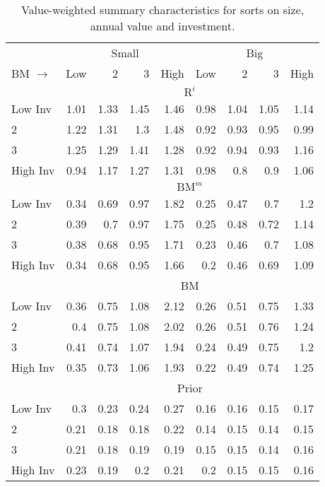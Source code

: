 
\begin{table}[!ht]
\scriptsize
\centering
\caption{
\scriptsize{
Value-weighted summary characteristics for sorts on size, annual value and
investment.
}
}
\begin{tabular}{lrrrrrrrr}
  \toprule
     & \multicolumn{4}{c}{Small} & \multicolumn{4}{c}{Big}  \\
     \cmidrule(r){2-5} \cmidrule(r){6-9}
    BM $\rightarrow$ & Low & 2 & 3 & High & Low & 2 & 3 & High  \\ 
  \midrule
  
  
    & \multicolumn{8}{c}{$\text{R}^i$}  \\
     \cmidrule(r){2-5} \cmidrule(r){6-9}
    Low Inv  & 1.01  & 1.33  & 1.45  & 1.46  & 0.98  & 1.04  & 1.05  & 1.14   \\
    2  & 1.22  & 1.31  & 1.3  & 1.48  & 0.92  & 0.93  & 0.95  & 0.99   \\
    3  & 1.25  & 1.29  & 1.41  & 1.28  & 0.92  & 0.94  & 0.93  & 1.16   \\
    High Inv  & 0.94  & 1.17  & 1.27  & 1.31  & 0.98  & 0.8  & 0.9  & 1.06   \\
    
  
    & \multicolumn{8}{c}{$\text{BM}^m$}  \\
     \cmidrule(r){2-5} \cmidrule(r){6-9}
    Low Inv  & 0.34  & 0.69  & 0.97  & 1.82  & 0.25  & 0.47  & 0.7  & 1.2   \\
    2  & 0.39  & 0.7  & 0.97  & 1.75  & 0.25  & 0.48  & 0.72  & 1.14   \\
    3  & 0.38  & 0.68  & 0.95  & 1.71  & 0.23  & 0.46  & 0.7  & 1.08   \\
    High Inv  & 0.34  & 0.68  & 0.95  & 1.66  & 0.2  & 0.46  & 0.69  & 1.09   \\
    
  
    & \multicolumn{8}{c}{BM}  \\
     \cmidrule(r){2-5} \cmidrule(r){6-9}
    Low Inv  & 0.36  & 0.75  & 1.08  & 2.12  & 0.26  & 0.51  & 0.75  & 1.33   \\
    2  & 0.4  & 0.75  & 1.08  & 2.02  & 0.26  & 0.51  & 0.76  & 1.24   \\
    3  & 0.41  & 0.74  & 1.07  & 1.94  & 0.24  & 0.49  & 0.75  & 1.2   \\
    High Inv  & 0.35  & 0.73  & 1.06  & 1.93  & 0.22  & 0.49  & 0.74  & 1.25   \\
    
  
    & \multicolumn{8}{c}{Prior}  \\
     \cmidrule(r){2-5} \cmidrule(r){6-9}
    Low Inv  & 0.3  & 0.23  & 0.24  & 0.27  & 0.16  & 0.16  & 0.15  & 0.17   \\
    2  & 0.21  & 0.18  & 0.18  & 0.22  & 0.14  & 0.15  & 0.14  & 0.15   \\
    3  & 0.21  & 0.18  & 0.19  & 0.19  & 0.15  & 0.15  & 0.14  & 0.16   \\
    High Inv  & 0.23  & 0.19  & 0.2  & 0.21  & 0.2  & 0.15  & 0.15  & 0.16   \\
    

\end{tabular}
\end{table}
